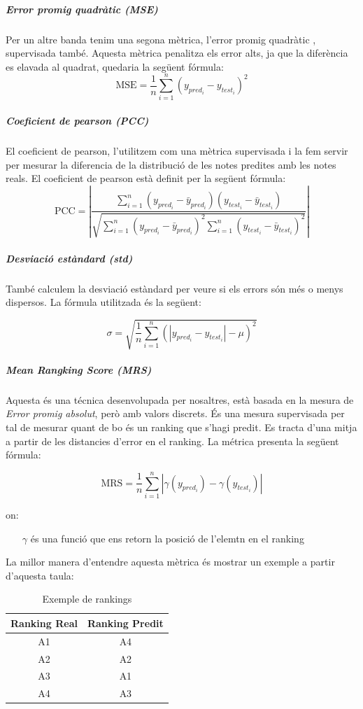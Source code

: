 \documentclass[12pt,a4paper,catalan]{article}
\begin{document}
\subparagraph{Error promig quadràtic (MSE)}
Per un altre banda tenim una segona mètrica, l'error promig quadràtic \cite{mse}, supervisada també. Aquesta mètrica penalitza els error alts, ja que la diferència es elavada al quadrat, quedaria la següent fórmula:
$$\mathrm{MSE}=\frac{1}{n}\sum_{i=1}^n(y_{pred_i}-y_{test_i})^2$$

\subparagraph{Coeficient de pearson (PCC)}
El coeficient de pearson, l'utilitzem com una mètrica supervisada i la fem servir per mesurar la diferencia de la distribució de les notes predites amb les notes reals. El coeficient de pearson està definit per la següent fórmula:
$$\mathrm{PCC} =\left| \frac{\sum_{i=1}^n(y_{pred_i} - \bar{y}_{pred_i})(y_{test_i} - \bar{y}_{test_i})}{\sqrt{\sum_{i=1}^n(y_{pred_i} - \bar{y}_{pred_i})^2  \sum_{i=1}^n(y_{test_i} - \bar{y}_{test_i})^2}}\right|$$

\subparagraph{Desviació estàndard (std)}
També calculem la desviació estàndard per veure si els errors són més o menys dispersos. La fórmula utilitzada és la següent:

$$ \sigma = \sqrt{ \frac{1}{n} \sum_{i=1}^n (\left| y_{pred_i}-y_{test_i}\right| - \mu)^2 } $$

\subparagraph{\textit{Mean Rangking Score (MRS)}}
Aquesta és una técnica desenvolupada per nosaltres, està basada en la mesura de \textit{Error promig absolut}, però amb valors discrets. És una mesura supervisada per tal de mesurar quant de bo és un ranking que s'hagi predit. Es tracta d'una mitja a partir de les distancies d'error en el ranking. La métrica presenta la següent fórmula:

$$ \mathrm{MRS} = \frac{1}{n}\sum_{i=1}^n \left| \gamma(y_{pred_i}) -  \gamma(y_{test_i})\right| $$

on:
\begin{itemize}[leftmargin=.5in]
	\item [$\gamma$] és una funció que ens retorn la posició de l'elemtn en el ranking
\end{itemize}

\newpage

La millor manera d'entendre aquesta mètrica és mostrar un exemple a partir d'aquesta taula:

\begin{table}[h]
\centering
\label{my-label}
\begin{tabular}{@{}cc@{}}
\toprule
Ranking Real & Ranking Predit \\ \midrule
A1           & A4             \\
A2           & A2             \\
A3           & A1             \\
A4           & A3             \\ \bottomrule
\end{tabular}
\caption{Exemple de rankings}
\end{table}
\end{document}
